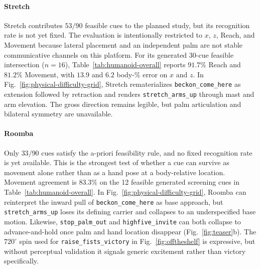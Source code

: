 \documentclass[letterpaper,10pt,conference]{ieeeconf}
\begin{document}
\paragraph{Stretch}
Stretch contributes $53/90$ feasible cues to the planned study, but its recognition rate is not yet fixed.
The evaluation is intentionally restricted to $x$, $z$, Reach, and Movement because lateral placement and an independent palm are not stable communicative channels on this platform.
For its generated 30-cue feasible intersection ($n{=}16$), Table~\ref{tab:humanoid-overall} reports $91.7\%$ Reach and $81.2\%$ Movement, with $13.9$ and $6.2$ body-\% error on $x$ and $z$.
In Fig.~\ref{fig:physical-difficulty-grid}, Stretch rematerializes \texttt{beckon\_come\_here} as extension followed by retraction and renders \texttt{stretch\_arms\_up} through mast and arm elevation.
The gross direction remains legible, but palm articulation and bilateral symmetry are unavailable.

\paragraph{Roomba}
Only $33/90$ cues satisfy the a-priori feasibility rule, and no fixed recognition rate is yet available.
This is the strongest test of whether a cue can survive as movement alone rather than as a hand pose at a body-relative location.
Movement agreement is $83.3\%$ on the 12 feasible generated screening cues in Table~\ref{tab:humanoid-overall}.
In Fig.~\ref{fig:physical-difficulty-grid}, Roomba can reinterpret the inward pull of \texttt{beckon\_come\_here} as base approach, but \texttt{stretch\_arms\_up} loses its defining carrier and collapses to an underspecified base motion.
Likewise, \texttt{stop\_palm\_out} and \texttt{highfive\_invite} can both collapse to advance-and-hold once palm and hand location disappear (Fig.~\ref{fig:teaser}b).
The $720^\circ$ spin used for \texttt{raise\_fists\_victory} in Fig.~\ref{fig:offtheshelf} is expressive, but without perceptual validation it signals generic excitement rather than victory specifically.
\end{document}

